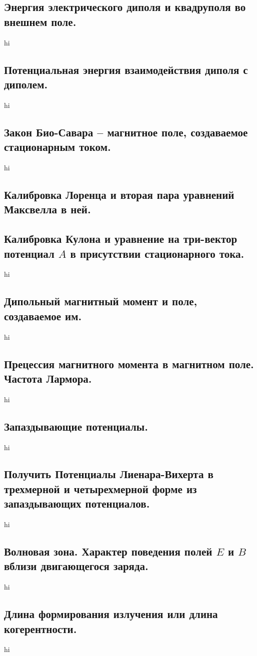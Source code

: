 \documentclass[a4paper,12pt]{article}
\begin{document}
\subsection{Энергия электрического диполя и квадруполя во внешнем поле.}
hi
\subsection{Потенциальная энергия взаимодействия диполя с диполем.}
hi
\subsection{Закон Био-Савара – магнитное поле, создаваемое стационарным током.}
hi
\subsection{Калибровка Лоренца и вторая пара уравнений Максвелла в ней.}
\label{subsec:lorentz}
\subsection{Калибровка Кулона и уравнение на три-вектор потенциал $A$ в
присутствии стационарного тока.}
hi
\subsection{Дипольный магнитный момент и поле, создаваемое им.}
hi
\subsection{Прецессия магнитного момента в магнитном поле. Частота Лармора.}
hi
\subsection{Запаздывающие потенциалы.}
hi
\subsection{Получить Потенциалы Лиенара-Вихерта в трехмерной и четырехмерной
форме из запаздывающих потенциалов.}
hi
\subsection{Волновая зона. Характер поведения полей $E$ и $B$ вблизи
двигающегося заряда.}
hi
\subsection{Длина формирования излучения или длина когерентности.}
hi
\end{document}
